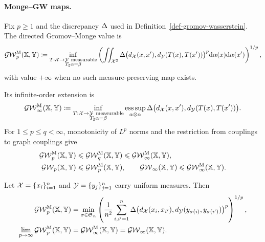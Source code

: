 \paragraph{Monge--GW maps.}
\begin{defn}\label{def-gromov-monge}
Fix $p\geq1$ and the discrepancy $\Delta$ used in Definition~\ref{def-gromov-wasserstein}. The directed Gromov--Monge value is
\begin{equation}\label{eq-gromov-monge-p}
\operatorname{\mathcal{GW}}_p^{\mathrm M}(\mathbb{X},\mathbb{Y})
\coloneqq
\inf_{\substack{T:\mathcal{X}\to\mathcal{Y}\ \mathrm{measurable}\\T_\sharp\alpha=\beta}}
\left(
\iint_{\mathcal{X}^2}
\Delta\bigl(d_{\mathcal{X}}(x,x'),d_{\mathcal{Y}}(T(x),T(x'))\bigr)^p
\mathrm{d}\alpha(x)\mathrm{d}\alpha(x')
\right)^{1/p},
\end{equation}
with value $+\infty$ when no such measure-preserving map exists.
\end{defn}
Its infinite-order extension is
\begin{equation}\label{eq-gromov-monge-infinity}
\operatorname{\mathcal{GW}}_\infty^{\mathrm M}(\mathbb{X},\mathbb{Y})
\coloneqq
\inf_{\substack{T:\mathcal{X}\to\mathcal{Y}\ \mathrm{measurable}\\T_\sharp\alpha=\beta}}
\operatorname*{ess\,sup}_{\alpha\otimes\alpha}
\Delta\bigl(d_{\mathcal{X}}(x,x'),d_{\mathcal{Y}}(T(x),T(x'))\bigr).
\end{equation}
For $1\leq p\leq q<\infty$, monotonicity of $L^p$ norms and the restriction from couplings to graph couplings give
\begin{equation}\label{eq-gromov-monge-basic-comparisons}
\begin{aligned}
\operatorname{\mathcal{GW}}_p^{\mathrm M}(\mathbb{X},\mathbb{Y})
&\leqslant
\operatorname{\mathcal{GW}}_q^{\mathrm M}(\mathbb{X},\mathbb{Y})
\leqslant
\operatorname{\mathcal{GW}}_\infty^{\mathrm M}(\mathbb{X},\mathbb{Y}),\\
\operatorname{\mathcal{GW}}_p(\mathbb{X},\mathbb{Y})
&\leqslant
\operatorname{\mathcal{GW}}_p^{\mathrm M}(\mathbb{X},\mathbb{Y}),
\qquad
\operatorname{\mathcal{GW}}_\infty(\mathbb{X},\mathbb{Y})\leqslant\operatorname{\mathcal{GW}}_\infty^{\mathrm M}(\mathbb{X},\mathbb{Y}).
\end{aligned}
\end{equation}
\begin{prop}\label{prop-finite-uniform-gromov-monge-limit}
Let $\mathcal{X}=\{x_i\}_{i=1}^n$ and $\mathcal{Y}=\{y_j\}_{j=1}^n$ carry uniform measures. Then
\begin{align}
\operatorname{\mathcal{GW}}_p^{\mathrm M}(\mathbb{X},\mathbb{Y})
&=
\min_{\sigma\in\mathfrak S_n}
\left(
\frac1{n^2}\sum_{i,i'=1}^n
\Delta\bigl(d_{\mathcal{X}}(x_i,x_{i'}),d_{\mathcal{Y}}(y_{\sigma(i)},y_{\sigma(i')})\bigr)^p
\right)^{1/p},
\label{eq-finite-gromov-monge-p}\\
\lim_{p\to\infty}\operatorname{\mathcal{GW}}_p^{\mathrm M}(\mathbb{X},\mathbb{Y})
&=
\operatorname{\mathcal{GW}}_\infty^{\mathrm M}(\mathbb{X},\mathbb{Y})
=
\operatorname{\mathcal{GW}}_\infty(\mathbb{X},\mathbb{Y}).
\label{eq-finite-gw-gm-infinity-limit}
\end{align}
\end{prop}
